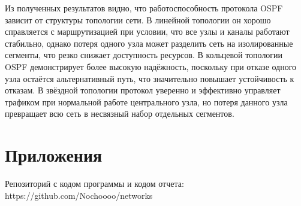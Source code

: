 \documentclass[a4paper,12pt]{article}
\begin{document}
Из полученных результатов видно, что работоспособность протокола OSPF зависит от структуры топологии сети. В линейной топологии он хорошо справляется с маршрутизацией при условии, что все узлы и каналы работают стабильно, однако потеря одного узла может разделить сеть на изолированные сегменты, что резко снижает доступность ресурсов. В кольцевой топологии OSPF демонстрирует более высокую надёжность, поскольку при отказе одного узла остаётся альтернативный путь, что значительно повышает устойчивость к отказам. В звёздной топологии протокол уверенно и эффективно управляет трафиком при нормальной работе центрального узла, но потеря данного узла превращает всю сеть в несвязный набор отдельных сегментов. 

\section{Приложения}

Репозиторий с кодом программы и кодом отчета: https://github.com/Nochoooo/networks
\end{document}
